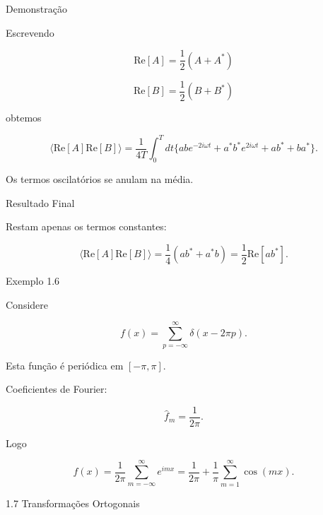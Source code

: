 \documentclass[aspectratio=169]{beamer}
\newcommand{\blue}[1]{\textcolor{myblue}{#1}}
\begin{document}
\begin{frame}{Demonstração}

Escrevendo

\[
\mathrm{Re}[A]=\frac12(A+A^*)
\]

\[
\mathrm{Re}[B]=\frac12(B+B^*)
\]

obtemos

\begin{equation}
\langle
\mathrm{Re}[A]\mathrm{Re}[B]
\rangle
=
\frac{1}{4T}
\int_0^T dt
\{abe^{-2i\omega t}+a^*b^*e^{2i\omega t}+ab^*+ba^*\}.
\tag{1.138}
\end{equation}

Os termos oscilatórios se anulam na média.

\end{frame}

\begin{frame}{Resultado Final}

Restam apenas os termos constantes:

\begin{equation}
\langle
\mathrm{Re}[A]\mathrm{Re}[B]
\rangle
=
\frac14(ab^*+a^*b)
=
\frac12\mathrm{Re}[ab^*].
\tag{1.139}
\end{equation}

\end{frame}

\begin{frame}{Exemplo 1.6}

Considere

\[
f(x)=\sum_{p=-\infty}^{\infty}\delta(x-2\pi p).
\]

Esta função é periódica em $[-\pi,\pi]$.

Coeficientes de Fourier:

\[
\hat f_m=\frac{1}{2\pi}.
\]

Logo

\[
f(x)=\frac{1}{2\pi}
\sum_{m=-\infty}^{\infty}e^{imx}
=
\frac{1}{2\pi}
+
\frac{1}{\pi}
\sum_{m=1}^{\infty}\cos(mx).
\]

\end{frame}



\begin{frame}[plain]
\centering
\vfill
{\Huge\blue{1.7 Transformações Ortogonais}}
\vfill
\end{frame}
\end{document}
